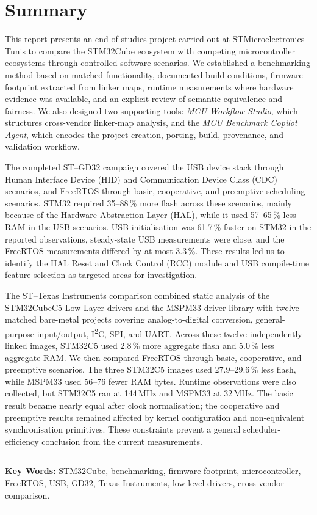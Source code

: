\chapter*{Summary}

This report presents an end-of-studies project carried out at STMicroelectronics Tunis to
compare the STM32Cube ecosystem with competing microcontroller ecosystems through controlled
software scenarios. We established a benchmarking method based on matched functionality,
documented build conditions, firmware footprint extracted from linker maps, runtime
measurements where hardware evidence was available, and an explicit review of semantic
equivalence and fairness. We also designed two supporting tools: \emph{MCU Workflow Studio},
which structures cross-vendor linker-map analysis, and the \emph{MCU Benchmark Copilot Agent},
which encodes the project-creation, porting, build, provenance, and validation workflow.

The completed ST--GD32 campaign covered the USB device stack through Human Interface Device
(HID) and Communication Device Class (CDC) scenarios, and FreeRTOS through basic,
cooperative, and preemptive scheduling scenarios. STM32 required 35--88\,\% more flash across
these scenarios, mainly because of the Hardware Abstraction Layer (HAL), while it used
57--65\,\% less RAM in the USB scenarios. USB initialisation was 61.7\,\% faster on STM32 in
the reported observations, steady-state USB measurements were close, and the FreeRTOS
measurements differed by at most 3.3\,\%. These results led us to identify the HAL Reset and
Clock Control (RCC) module and USB compile-time feature selection as targeted areas for
investigation.

The ST--Texas Instruments comparison combined static analysis of the STM32CubeC5 Low-Layer
drivers and the MSPM33 driver library with twelve matched bare-metal projects covering
analog-to-digital conversion, general-purpose input/output, I\textsuperscript{2}C, SPI, and
UART. Across these twelve independently linked images, STM32C5 used 2.8\,\% more aggregate
flash and 5.0\,\% less aggregate RAM. We then compared FreeRTOS through basic, cooperative,
and preemptive scenarios. The three STM32C5 images used 27.9--29.6\,\% less flash, while
MSPM33 used 56--76 fewer RAM bytes. Runtime observations were also collected, but STM32C5
ran at 144\,MHz and MSPM33 at 32\,MHz. The basic result became nearly equal after clock
normalisation; the cooperative and preemptive results remained affected by kernel
configuration and non-equivalent synchronisation primitives. These constraints prevent a
general scheduler-efficiency conclusion from the current measurements.

\noindent\rule[2pt]{\textwidth}{0.5pt}

{\textbf{Key Words:}}
STM32Cube, benchmarking, firmware footprint, microcontroller, FreeRTOS, USB, GD32, Texas Instruments, low-level drivers, cross-vendor comparison.
\\
\noindent\rule[2pt]{\textwidth}{0.5pt}